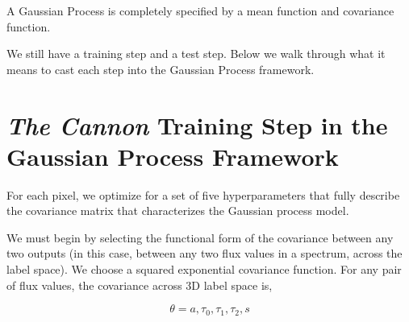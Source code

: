\documentclass[12pt, preprint]{aastex}
\begin{document}
A Gaussian Process is completely specified by a mean function and covariance 
function.

We still have a training step and a test step. Below we walk through what it 
means to cast each step into the Gaussian Process framework.

\section{\emph{The Cannon} Training Step in the Gaussian Process Framework}

For each pixel, we optimize for a set of five hyperparameters that fully 
describe the covariance matrix that characterizes the Gaussian process model.

We must begin by selecting the functional form of the covariance between any 
two outputs (in this case, between any two flux values in a spectrum, across 
the label space). We choose a squared exponential covariance function. 
For any pair of flux values, the covariance across 3D label space is,

\begin{equation}
  \theta = a, \tau_0, \tau_1, \tau_2, s
\end{equation}
\end{document}
